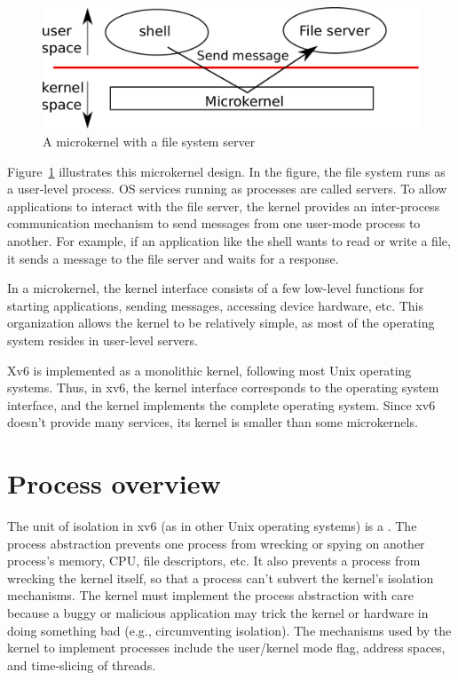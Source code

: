 \begin{figure}[t]
\center
\includegraphics[scale=0.5]{fig/mkernel.pdf}
\caption{A microkernel with a file system server}
\label{fig:mkernel}
\end{figure}

Figure~\ref{fig:mkernel}
illustrates this microkernel design.  In the figure, the file system runs as a
user-level process.  OS services running as processes are called servers.
To allow applications to interact with the
file server, the kernel provides an inter-process communication
mechanism to send messages from one
user-mode process to another.  For example, if an application like the shell
wants to read or write a file, it sends a message to the file server and waits
for a response. 

In a microkernel, the kernel interface consists of a few low-level
functions for starting applications, sending messages,
accessing device hardware, etc.  This organization allows the kernel to be 
relatively simple, as most of the operating system
resides in user-level servers.

Xv6 is
implemented as a monolithic kernel, following most Unix operating systems.
Thus, in xv6, the kernel interface corresponds to the operating system
interface, and the kernel implements the complete operating system.  Since 
xv6 doesn't provide many services, its kernel is smaller than some
microkernels.
\section{Process overview}

The unit of isolation in xv6 (as in other Unix operating systems) is a 
.
The process abstraction prevents one process from wrecking or spying on
another process's memory, CPU, file descriptors, etc.  It also prevents a process
from wrecking the kernel itself, so that a process can't subvert the kernel's
isolation mechanisms.
The kernel must implement the process abstraction with care because
a buggy or malicious application may trick the kernel or hardware in doing
something bad (e.g., circumventing isolation).  The mechanisms used by
the kernel to implement processes include the user/kernel mode flag, address spaces,
and time-slicing of threads.

